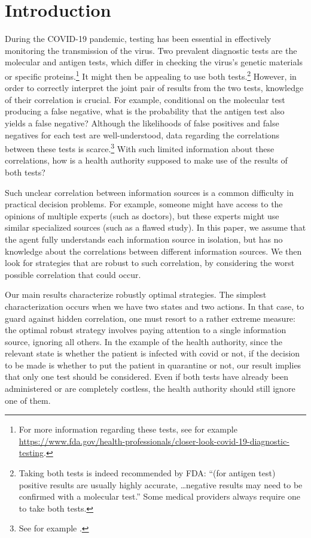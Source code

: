 \documentclass[11pt]{article}
\theoremstyle{plain}
\theoremstyle{remark}
\begin{document}
\section{Introduction}
During the COVID-19 pandemic, testing has been essential in effectively monitoring the transmission of the virus. Two prevalent diagnostic tests are the molecular and antigen tests, which differ in checking the virus's genetic materials or specific proteins.\footnote{For more information regarding these tests, see for example \url{https://www.fda.gov/health-professionals/closer-look-covid-19-diagnostic-testing}.}  It might then be appealing to use both tests.\footnote{Taking both tests is indeed recommended by FDA: ``(for antigen test) positive results are usually highly accurate, \dots negative results may need to be confirmed with a molecular test.'' Some medical providers always require one to take both tests.} However, in order to correctly interpret the joint pair of results from the two tests, knowledge of their correlation is crucial. For example, conditional on the molecular test producing a false negative, what is the probability that the antigen test also yields a false negative? Although the likelihoods of false positives and false negatives for each test are  well-understood, data regarding the correlations between these tests is scarce.\footnote{See for example \citet{dinnes2020rapid}.} With such limited information about these correlations, how is a
health authority supposed to make use of the results of both tests?

Such unclear correlation between information sources is a common difficulty in practical decision problems. For example, someone might have access to the opinions of multiple experts (such as doctors), but these experts might use similar specialized sources (such as a flawed study). In this paper, we assume that the agent fully understands each information source in isolation, but has no knowledge about the correlations between different information sources. We then look for strategies that are robust to such correlation, by considering the worst possible correlation that could occur. 

Our main results characterize robustly optimal strategies. The simplest characterization occurs when we have two states and two actions. In that case, to guard against hidden correlation, one must resort to a rather extreme measure: the optimal robust strategy involves paying attention to a single information source, ignoring all others. In the example of the health authority, since the relevant state is whether the patient is infected with covid or not, if the decision to be made is whether to put the patient in quarantine or not, our result implies that only one test should be considered. Even if both tests have already been administered or are completely costless, the health authority should still ignore one of them.  
\end{document}
